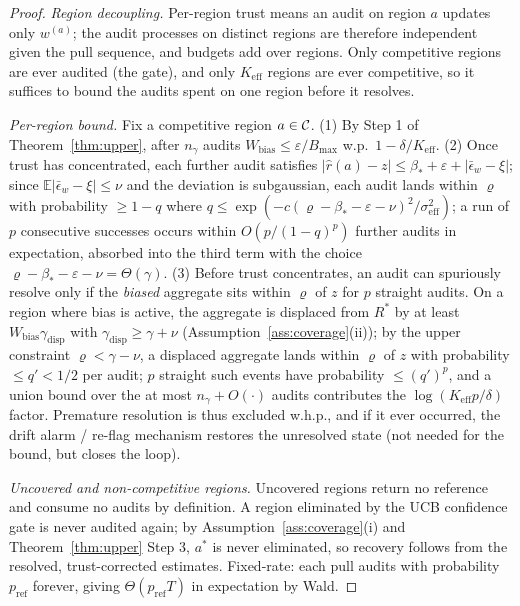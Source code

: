 \documentclass[11pt]{article}
\theoremstyle{definition}\newtheorem{definition}{Definition}
\theoremstyle{definition}\newtheorem{assumption}{Assumption}
\newcommand{\Rstar}{R^{\ast}}\newcommand{\astar}{a^{\ast}}
\newcommand{\E}{\mathbb{E}}\newcommand{\Prob}{\mathbb{P}}
\newcommand{\nfl}{\nu}                      %
\begin{document}
\begin{proof}
\emph{Region decoupling.} Per-region trust means an audit on region $a$ updates
only $w^{(a)}$; the audit processes on distinct regions are therefore independent
given the pull sequence, and budgets add over regions. Only competitive regions
are ever audited (the gate), and only $K_{\mathrm{eff}}$ regions are ever
competitive, so it suffices to bound the audits spent on one region before it
resolves.

\emph{Per-region bound.} Fix a competitive region $a\in\mathcal{C}$.
(1) By Step 1 of Theorem~\ref{thm:upper}, after $n_\gamma$ audits
$W_{\mathrm{bias}}\le\varepsilon/B_{\max}$ w.p.\ $1-\delta/K_{\mathrm{eff}}$.
(2) Once trust has concentrated, each further audit satisfies
$|\hat r(a)-z|\le \beta_\ast+\varepsilon+|\bar\epsilon_w-\xi|$; since
$\E|\bar\epsilon_w-\xi|\le\nfl$ and the deviation is subgaussian, each audit
lands within $\varrho$ with probability $\ge 1-q$ where
$q\le\exp(-c(\varrho-\beta_\ast-\varepsilon-\nfl)^2/\sigma_{\mathrm{eff}}^2)$;
a run of $p$ consecutive successes occurs within $O(p/(1-q)^p)$ further audits in
expectation, absorbed into the third term with the choice
$\varrho-\beta_\ast-\varepsilon-\nfl=\Theta(\gamma)$.
(3) Before trust concentrates, an audit can spuriously resolve only if the
\emph{biased} aggregate sits within $\varrho$ of $z$ for $p$ straight audits. On
a region where bias is active, the aggregate is displaced from $\Rstar$ by at
least $W_{\mathrm{bias}}\gamma_{\mathrm{disp}}$ with
$\gamma_{\mathrm{disp}}\ge\gamma+\nfl$ (Assumption~\ref{ass:coverage}(ii));
by the upper constraint $\varrho<\gamma-\nfl$, a displaced aggregate lands within
$\varrho$ of $z$ with probability $\le q'\!<\!1/2$ per audit; $p$ straight such events
have probability $\le (q')^{p}$, and a union bound over the at most
$n_\gamma+O(\cdot)$ audits contributes the $\log(K_{\mathrm{eff}}p/\delta)$
factor. Premature resolution is thus excluded w.h.p., and if it ever occurred,
the drift alarm / re-flag mechanism restores the unresolved state (not needed for
the bound, but closes the loop).

\emph{Uncovered and non-competitive regions.} Uncovered regions return no
reference and consume no audits by definition. A region eliminated by the UCB
confidence gate is never audited again; by Assumption~\ref{ass:coverage}(i) and
Theorem~\ref{thm:upper} Step 3, $\astar$ is never eliminated, so recovery follows
from the resolved, trust-corrected estimates. Fixed-rate: each pull audits with
probability $p_{\mathrm{ref}}$ forever, giving $\Theta(p_{\mathrm{ref}}T)$ in
expectation by Wald.
\end{proof}
\end{document}
